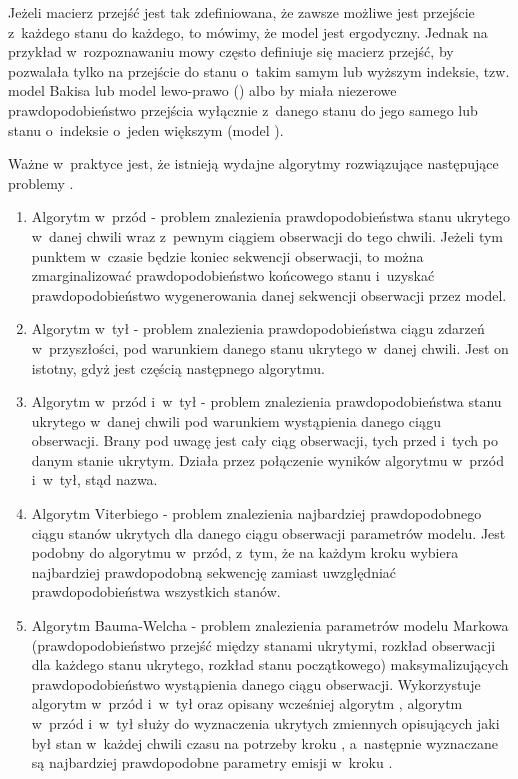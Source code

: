Jeżeli macierz przejść jest tak zdefiniowana, że zawsze możliwe jest przejście z~każdego stanu do każdego, to
mówimy, że model jest ergodyczny. Jednak na przykład w~rozpoznawaniu mowy często definiuje się macierz przejść,
by pozwalała tylko na przejście do stanu o~takim samym lub wyższym indeksie, tzw. model Bakisa lub model lewo-prawo
() albo by miała niezerowe prawdopodobieństwo przejścia wyłącznie z~danego stanu do jego
samego lub stanu o~indeksie o~jeden większym (model ).

Ważne w~praktyce jest, że istnieją wydajne algorytmy rozwiązujące następujące problemy .

\begin{enumerate}
    \item Algorytm w~przód - problem znalezienia prawdopodobieństwa stanu ukrytego w~danej chwili wraz z~pewnym ciągiem obserwacji do tego chwili. Jeżeli tym punktem w~czasie będzie koniec sekwencji obserwacji, to można zmarginalizować prawdopodobieństwo końcowego stanu i~uzyskać prawdopodobieństwo wygenerowania danej sekwencji obserwacji przez model.
    \item Algorytm w~tył - problem znalezienia prawdopodobieństwa ciągu zdarzeń w~przyszłości, pod warunkiem danego stanu ukrytego w~danej chwili. Jest on istotny, gdyż jest częścią następnego algorytmu.
    \item Algorytm w~przód i~w~tył - problem znalezienia prawdopodobieństwa stanu ukrytego w~danej chwili pod warunkiem wystąpienia danego ciągu obserwacji. Brany pod uwagę jest cały ciąg obserwacji, tych przed i~tych po danym stanie ukrytym. Działa przez połączenie wyników algorytmu w~przód i~w~tył, stąd nazwa.
    \item Algorytm Viterbiego - problem znalezienia najbardziej prawdopodobnego ciągu stanów ukrytych dla danego ciągu obserwacji parametrów modelu. Jest podobny do algorytmu w~przód, z~tym, że na każdym kroku wybiera najbardziej prawdopodobną sekwencję zamiast uwzględniać prawdopodobieństwa wszystkich stanów.
    \item Algorytm Bauma-Welcha - problem znalezienia parametrów modelu Markowa (prawdopodobieństwo przejść między stanami ukrytymi, rozkład obserwacji dla każdego stanu ukrytego, rozkład stanu początkowego) maksymalizujących prawdopodobieństwo wystąpienia danego ciągu obserwacji. Wykorzystuje algorytm w~przód i~w~tył oraz opisany wcześniej algorytm , algorytm w~przód i~w~tył służy do wyznaczenia ukrytych zmiennych opisujących jaki był stan w~każdej chwili czasu na potrzeby kroku , a~następnie wyznaczane są najbardziej prawdopodobne parametry emisji w~kroku .
\end{enumerate}

